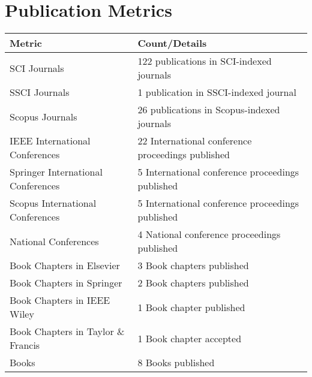 \documentclass[11pt,a4paper]{moderncv}
\begin{document}
\vspace{1cm}

\section{\textbf{Publication Metrics}}

\begin{adjustwidth}{6em}{0pt}
\begin{center}
\begin{tabular}{p{7cm}p{9cm}}
	
	\hline
	\textbf{Metric} & \textbf{Count/Details} \\
	\hline
	SCI Journals& 122 publications in SCI-indexed journals \\
	SSCI Journals& 1 publication in SSCI-indexed journal \\
	Scopus Journals& 26 publications in Scopus-indexed journals \\
	IEEE International Conferences & 22 International conference proceedings published \\
	Springer International Conferences  & 5 International conference proceedings published \\
	Scopus International Conferences  & 5 International conference proceedings published \\
	National Conferences  & 4 National conference proceedings published \\
	Book Chapters in Elsevier & 3 Book chapters published \\
	Book Chapters in Springer & 2 Book chapters published \\
	Book Chapters in IEEE Wiley & 1 Book chapter published \\
	Book Chapters in Taylor \& Francis & 1 Book chapter accepted \\
	Books & 8 Books published \\
	\hline
\end{tabular}
\end{center}
\end{adjustwidth}
\end{document}
